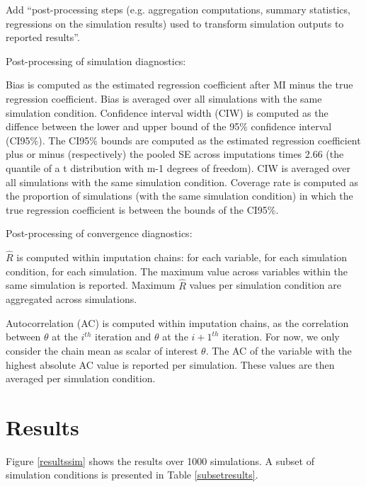 \documentclass[article]{jss}
\begin{document}
Add ``post-processing steps (e.g. aggregation computations, summary statistics, regressions on the simulation results) used to transform simulation outputs to reported results''. %

Post-processing of simulation diagnostics:

Bias is computed as the estimated regression coefficient after MI minus the true regression coefficient. Bias is averaged over all simulations with the same simulation condition.
Confidence interval width (CIW) is computed as the diffence between the lower and upper bound of the 95\% confidence interval (CI95\%). The CI95\% bounds are computed as the estimated regression coefficient plus or minus (respectively) the pooled SE across imputations times 2.66 (the quantile of a t distribution with m-1 degrees of freedom). CIW is averaged over all simulations with the same simulation condition.
Coverage rate is computed as the proportion of simulations (with the same simulation condition) in which the true regression coefficient is between the bounds of the CI95\%. 

Post-processing of convergence diagnostics:

$\widehat{R}$ is computed within imputation chains: for each variable, for each simulation condition, for each simulation. The maximum value across variables within the same simulation is reported. Maximum $\widehat{R}$ values per simulation condition are aggregated across simulations.

Autocorrelation (AC) is computed within imputation chains, as the correlation between $\theta$ at the $i^{th}$ iteration and $\theta$ at the $i+1^{th}$ iteration. For now, we only consider the chain mean as scalar of interest $\theta$. The AC of the variable with the highest absolute AC value is reported per simulation. These values are then averaged per simulation condition.




\section{Results}

Figure \ref{resultssim} shows the results over 1000 simulations. A subset of simulation conditions is presented in Table \ref{subsetresults}. 
\end{document}
